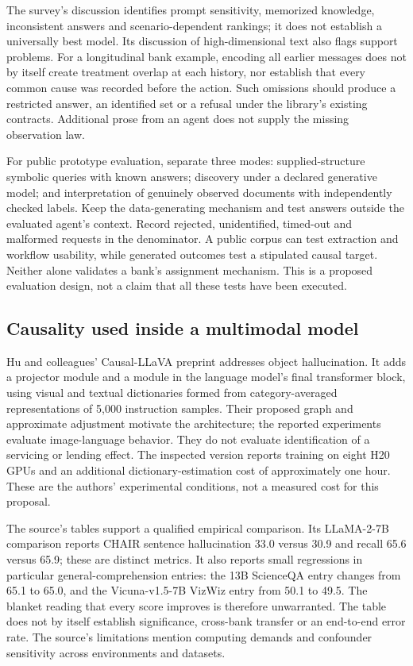The survey's discussion identifies prompt sensitivity, memorized knowledge, inconsistent answers and scenario-dependent
rankings; it does not establish a universally best model. Its discussion of high-dimensional text also flags support problems.
For a longitudinal bank example, encoding all earlier messages does not by itself create treatment overlap at each history,
nor establish that every common cause was recorded before the action. Such omissions should produce a restricted answer,
an identified set or a refusal under the library's existing contracts. Additional prose from an agent does not supply the
missing observation law.\citep{exec28_fr_ma}

For public prototype evaluation, separate three modes: supplied-structure symbolic queries with known answers;
discovery under a declared generative model; and interpretation of genuinely observed documents with independently checked
labels. Keep the data-generating mechanism and test answers outside the evaluated agent's context. Record rejected,
unidentified, timed-out and malformed requests in the denominator. A public corpus can test extraction and workflow usability,
while generated outcomes test a stipulated causal target. Neither alone validates a bank's assignment mechanism.
This is a proposed evaluation design, not a claim that all these tests have been executed.

\subsection{Causality used inside a multimodal model}
Hu and colleagues' Causal-LLaVA preprint addresses object hallucination. It adds a projector module and a module in the
language model's final transformer block, using visual and textual dictionaries formed from category-averaged representations
of 5,000 instruction samples. Their proposed graph and approximate adjustment motivate the architecture; the reported
experiments evaluate image-language behavior. They do not evaluate identification of a servicing or lending effect.
The inspected version reports training on eight H20 GPUs and an additional dictionary-estimation cost of approximately
one hour. These are the authors' experimental conditions, not a measured cost for this proposal.\citep{exec28_fr_hu}

The source's tables support a qualified empirical comparison. Its LLaMA-2-7B comparison reports CHAIR sentence hallucination
33.0 versus 30.9 and recall 65.6 versus 65.9; these are distinct metrics. It also reports small regressions in particular
general-comprehension entries: the 13B ScienceQA entry changes from 65.1 to 65.0, and the Vicuna-v1.5-7B VizWiz entry
from 50.1 to 49.5. The blanket reading that every score improves is therefore unwarranted. The table does not by itself
establish significance, cross-bank transfer or an end-to-end error rate. The source's limitations mention computing demands
and confounder sensitivity across environments and datasets.\citep{exec28_fr_hu}

